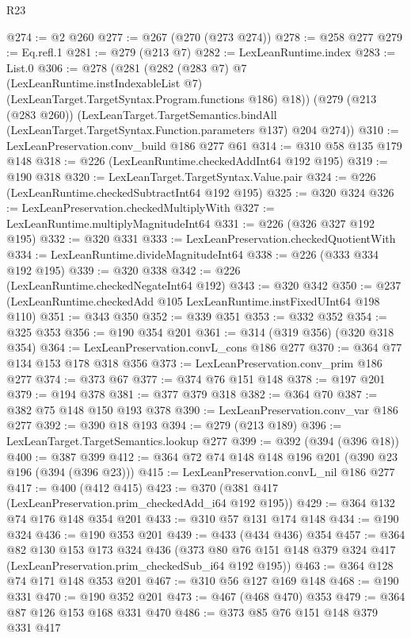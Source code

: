 \begin{lexlean}{R23}
\begin{coremodule}
{{{{{@274 := @2 @260
@277 := @267 (@270 (@273 @274))
@278 := @258 @277
@279 := Eq.refl.{1}
@281 := @279 (@213 @7)
@282 := LexLeanRuntime.index
@283 := List.{0}
@306 := @278
    (@281
      (@282
        (@283 @7)
        @7
        (LexLeanRuntime.instIndexableList @7)
        (LexLeanTarget.TargetSyntax.Program.functions @186)
        @18))
    (@279
      (@213 (@283 @260))
      (LexLeanTarget.TargetSemantics.bindAll
        (LexLeanTarget.TargetSyntax.Function.parameters @137)
        @204
        @274))
@310 := LexLeanPreservation.conv_build @186 @277 @61
@314 := @310 @58 @135 @179 @148
@318 := @226 (LexLeanRuntime.checkedAddInt64 @192 @195)
@319 := @190 @318
@320 := LexLeanTarget.TargetSyntax.Value.pair
@324 := @226 (LexLeanRuntime.checkedSubtractInt64 @192 @195)
@325 := @320 @324
@326 := LexLeanPreservation.checkedMultiplyWith
@327 := LexLeanRuntime.multiplyMagnitudeInt64
@331 := @226 (@326 @327 @192 @195)
@332 := @320 @331
@333 := LexLeanPreservation.checkedQuotientWith
@334 := LexLeanRuntime.divideMagnitudeInt64
@338 := @226 (@333 @334 @192 @195)
@339 := @320 @338
@342 := @226 (LexLeanRuntime.checkedNegateInt64 @192)
@343 := @320 @342
@350 := @237 (LexLeanRuntime.checkedAdd @105 LexLeanRuntime.instFixedUInt64 @198 @110)
@351 := @343 @350
@352 := @339 @351
@353 := @332 @352
@354 := @325 @353
@356 := @190 @354 @201
@361 := @314 (@319 @356) (@320 @318 @354)
@364 := LexLeanPreservation.convL_cons @186 @277
@370 := @364 @77 @134 @153 @178 @318 @356
@373 := LexLeanPreservation.conv_prim @186 @277
@374 := @373 @67
@377 := @374 @76 @151 @148
@378 := @197 @201
@379 := @194 @378
@381 := @377 @379 @318
@382 := @364 @70
@387 := @382 @75 @148 @150 @193 @378
@390 := LexLeanPreservation.conv_var @186 @277
@392 := @390 @18 @193
@394 := @279 (@213 @189)
@396 := LexLeanTarget.TargetSemantics.lookup @277
@399 := @392 (@394 (@396 @18))
@400 := @387 @399
@412 := @364 @72 @74 @148 @148 @196 @201 (@390 @23 @196 (@394 (@396 @23)))
@415 := LexLeanPreservation.convL_nil @186 @277
@417 := @400 (@412 @415)
@423 := @370 (@381 @417 (LexLeanPreservation.prim_checkedAdd_i64 @192 @195))
@429 := @364 @132 @74 @176 @148 @354 @201
@433 := @310 @57 @131 @174 @148
@434 := @190 @324
@436 := @190 @353 @201
@439 := @433 (@434 @436) @354
@457 := @364
    @82
    @130
    @153
    @173
    @324
    @436
    (@373 @80 @76 @151 @148 @379 @324 @417 (LexLeanPreservation.prim_checkedSub_i64 @192 @195))
@463 := @364 @128 @74 @171 @148 @353 @201
@467 := @310 @56 @127 @169 @148
@468 := @190 @331
@470 := @190 @352 @201
@473 := @467 (@468 @470) @353
@479 := @364 @87 @126 @153 @168 @331 @470
@486 := @373 @85 @76 @151 @148 @379 @331 @417
}}}}}
\end{coremodule}
\end{lexlean}
